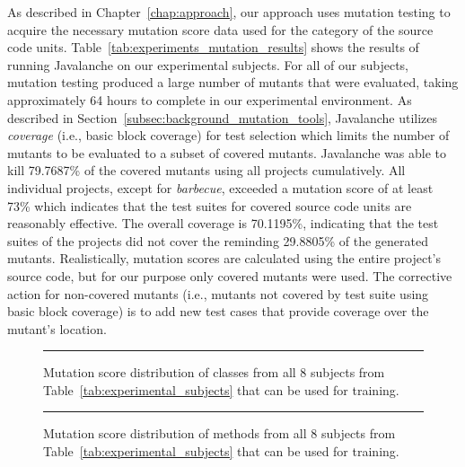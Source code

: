 \noindent
As described in Chapter~\ref{chap:approach}, our approach uses mutation testing to acquire the necessary mutation score data used for the category of the source code units. Table~\ref{tab:experiments_mutation_results} shows the results of running Javalanche on our experimental subjects. For all of our subjects, mutation testing produced a large number of mutants that were evaluated, taking approximately 64 hours to complete in our experimental environment. As described in Section~\ref{subsec:background_mutation_tools}, Javalanche utilizes \emph{coverage} (i.e., basic block coverage) for test selection which limits the number of mutants to be evaluated to a subset of covered mutants. Javalanche was able to kill 79.7687\% of the covered mutants using all projects cumulatively. All individual projects, except for \emph{barbecue}, exceeded a mutation score of at least 73\% which indicates that the test suites for covered source code units are reasonably effective. The overall coverage is 70.1195\%, indicating that the test suites of the projects did not cover the reminding 29.8805\% of the generated mutants. Realistically, mutation scores are calculated using the entire project's source code, but for our purpose only covered mutants were used. The corrective action for non-covered mutants (i.e., mutants not covered by test suite using basic block coverage) is to add new test cases that provide coverage over the mutant's location.

\begin{figure}[!tb]
  \centering
  \caption{Mutation score distribution of classes from all 8 subjects from Table~\ref{tab:experimental_subjects} that can be used for training.}
  \vspace{2mm}
  \hrule
  \label{fig:mutation_distributions_class_all}
\end{figure}

\begin{figure}[!tb]
  \centering
  \caption{Mutation score distribution of methods from all 8 subjects from Table~\ref{tab:experimental_subjects} that can be used for training.}
  \vspace{2mm}
  \hrule
  \label{fig:mutation_distributions_method_all}
\end{figure}

